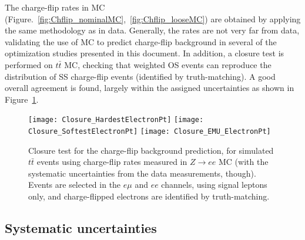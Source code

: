 The charge-flip rates in MC (Figure.~\ref{fig:Chflip_nominalMC},~\ref{fig:Chflip_looseMC}) 
are obtained by applying the same methodology as in data. 
Generally, the rates are not very far from data, validating the use of MC to predict charge-flip background 
in several of the optimization studies presented in this document. 
In addition, a closure test is performed on $t\bar t$ MC, 
checking that weighted OS events can reproduce the distribution of SS charge-flip events (identified by truth-matching). 
A good overall agreement is found, largely within the assigned uncertainties
as shown in Figure~\ref{fig:ChargeFlip_ClosureTest}. 

\begin{figure}[htb!]
\centering
{\texttt{[image: Closure\_HardestElectronPt]}}
{\texttt{[image: Closure\_SoftestElectronPt]}}
{\texttt{[image: Closure\_EMU\_ElectronPt]}}
\caption{Closure test for the charge-flip background prediction, for simulated $t\bar t$ events 
using charge-flip rates measured in $Z\to ee$ MC 
(with the systematic uncertainties from the data measurements, though). 
Events are selected in the $e\mu$ and $ee$ channels, using signal leptons only, 
and charge-flipped electrons are identified by truth-matching. 
}
\label{fig:ChargeFlip_ClosureTest}
\end{figure}

\subsection*{Systematic uncertainties}
\label{subsec:chargeflip_uncertainties}



